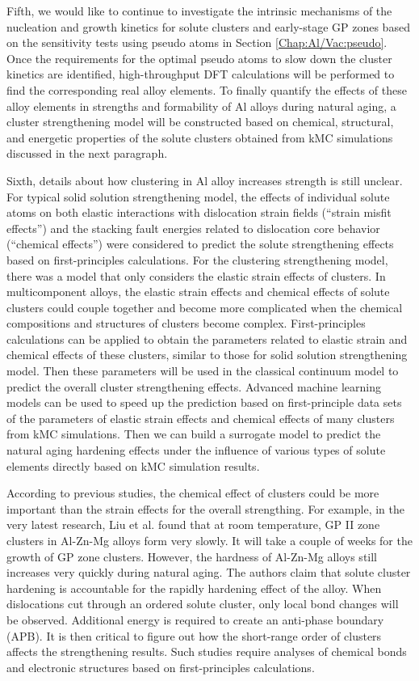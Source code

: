 Fifth, we would like to continue to investigate the intrinsic mechanisms of the nucleation and growth kinetics for solute clusters and early-stage GP zones based on the sensitivity tests using pseudo atoms in Section \ref{Chap:Al/Vac:pseudo}. Once the requirements for the optimal pseudo atoms to slow down the cluster kinetics are identified, high-throughput DFT calculations will be performed to find the corresponding real alloy elements. To finally quantify the effects of these alloy elements in strengths and formability of Al alloys during natural aging, a cluster strengthening model will be constructed based on chemical, structural, and energetic properties of the solute clusters obtained from \ac{kMC} simulations discussed in the next paragraph.

Sixth, details about how clustering in Al alloy increases strength is still unclear. For typical solid solution strengthening model, the effects of individual solute atoms on both elastic interactions with dislocation strain fields (``strain misfit effects'') and the stacking fault energies related to dislocation core behavior (``chemical effects'') were considered to predict the solute strengthening effects based on first-principles calculations\cite{yasi2010first}. For the clustering strengthening model, there was a model that only considers the elastic strain effects of clusters\cite{zhao2014cluster}. In multicomponent alloys, the elastic strain effects and chemical effects of solute clusters could couple together and become more complicated when the chemical compositions and structures of clusters become complex. First-principles calculations can be applied to obtain the parameters related to elastic strain and chemical effects of these clusters, similar to those for solid solution strengthening model\cite{yasi2010first}.  Then these parameters will be used in the classical continuum model to predict the overall cluster strengthening effects. Advanced machine learning models can be used to speed up the prediction based on first-principle data sets of the parameters of elastic strain effects and chemical effects of many clusters from \ac{kMC} simulations. Then we can build a surrogate model to predict the natural aging hardening effects under the influence of various types of solute elements directly based on \ac{kMC} simulation results.

According to previous studies, the chemical effect of clusters could be more important than the strain effects for the overall strengthing. For example, in the very latest research, Liu et al. \cite{liu2020formation} found that at room temperature, \ac{GP} II zone clusters in Al-Zn-Mg alloys form very slowly. It will take a couple of weeks for the growth of \ac{GP} zone clusters. However, the hardness of Al-Zn-Mg alloys still increases very quickly during natural aging. The authors claim that solute cluster hardening is accountable for the rapidly hardening effect of the alloy. When dislocations cut through an ordered solute cluster, only local bond changes will be observed. Additional energy is required to create an anti-phase boundary (APB). It is then critical to figure out how the short-range order of clusters affects the strengthening results.  Such studies require analyses of chemical bonds and electronic structures based on first-principles calculations. 